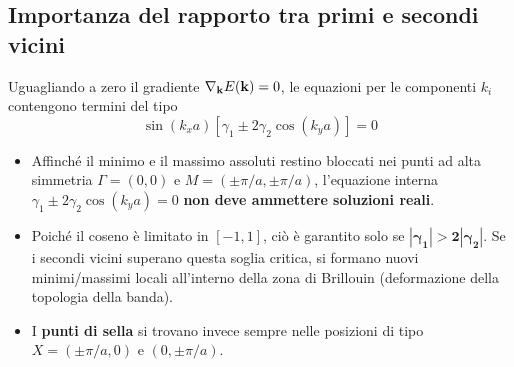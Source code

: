 \subsection{Importanza del rapporto tra primi e secondi vicini}
Uguagliando a zero il gradiente $\nabla_{\mathbf{k}}E(\mathbf{k})=0$, le equazioni per le componenti $k_i$ contengono termini del tipo
\[ \sin(k_x a)\left[\gamma_{1} \pm 2\gamma_{2}\cos(k_y a)\right] = 0 \]
\begin{itemize}
    \setlength{\itemsep}{1pt}
    \item Affinché il minimo e il massimo assoluti restino bloccati nei punti ad alta simmetria $\Gamma=(0,0)$ e $M=(\pm\pi/a,\pm\pi/a)$, l'equazione interna $\gamma_{1}\pm2\gamma_{2}\cos(k_ya)=0$ \textbf{non deve ammettere soluzioni reali}.
    \item Poiché il coseno è limitato in $[-1,1]$, ciò è garantito solo se $\bm{|\gamma_{1}| > 2|\gamma_{2}|}$. Se i secondi vicini superano questa soglia critica, si formano nuovi minimi/massimi locali all'interno della zona di Brillouin (deformazione della topologia della banda).
    \item I \textbf{punti di sella} si trovano invece sempre nelle posizioni di tipo $X=(\pm\pi/a,0)$ e $(0,\pm\pi/a)$.
\end{itemize}

